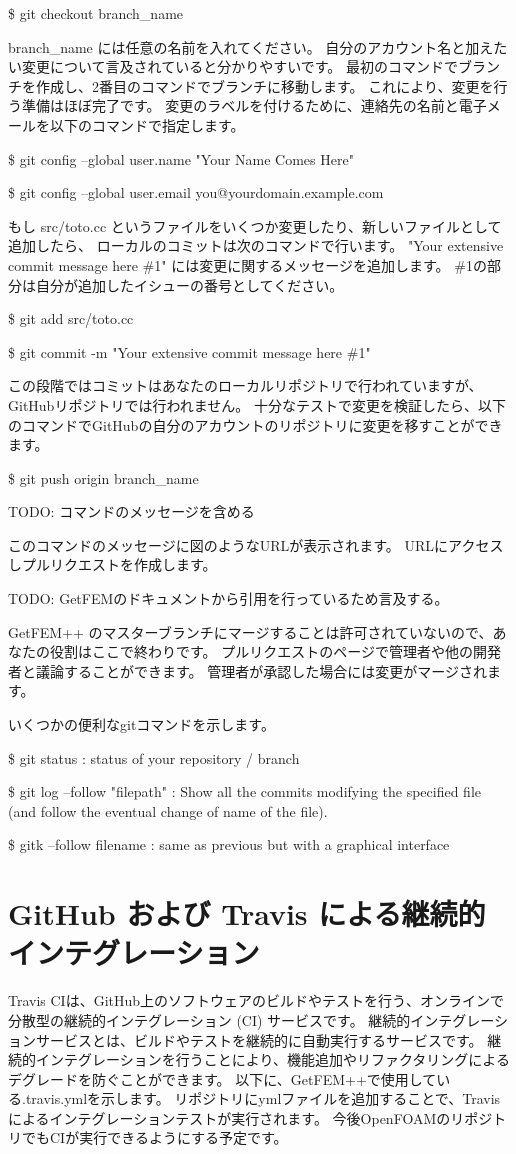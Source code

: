 \documentclass{ltjoc}
\begin{document}
\$ git checkout branch\_name

branch\_name には任意の名前を入れてください。
自分のアカウント名と加えたい変更について言及されていると分かりやすいです。
最初のコマンドでブランチを作成し、2番目のコマンドでブランチに移動します。
これにより、変更を行う準備はほぼ完了です。
変更のラベルを付けるために、連絡先の名前と電子メールを以下のコマンドで指定します。

\$ git config --global user.name "Your Name Comes Here"

\$ git config --global user.email you@yourdomain.example.com

もし src/toto.cc というファイルをいくつか変更したり、新しいファイルとして追加したら、
ローカルのコミットは次のコマンドで行います。
"Your extensive commit message here \#1" には変更に関するメッセージを追加します。
\#1の部分は自分が追加したイシューの番号としてください。

\$ git add src/toto.cc

\$ git commit -m "Your extensive commit message here \#1"

この段階ではコミットはあなたのローカルリポジトリで行われていますが、GitHubリポジトリでは行われません。
十分なテストで変更を検証したら、以下のコマンドでGitHubの自分のアカウントのリポジトリに変更を移すことができます。

\$ git push origin branch\_name

TODO: コマンドのメッセージを含める

このコマンドのメッセージに図のようなURLが表示されます。
URLにアクセスしプルリクエストを作成します。

TODO: GetFEMのドキュメントから引用を行っているため言及する。

GetFEM++ のマスターブランチにマージすることは許可されていないので、あなたの役割はここで終わりです。
プルリクエストのページで管理者や他の開発者と議論することができます。
管理者が承認した場合には変更がマージされます。

いくつかの便利なgitコマンドを示します。

\$ git status  : status of your repository / branch

\$ git log --follow "filepath"   : Show all the commits modifying the specified file (and follow the eventual change of name of the file).

\$ gitk --follow filename : same as previous but with a graphical interface

\section{GitHub および Travis による継続的インテグレーション}
Travis CIは、GitHub上のソフトウェアのビルドやテストを行う、オンラインで分散型の継続的インテグレーション (CI) サービスです。
継続的インテグレーションサービスとは、ビルドやテストを継続的に自動実行するサービスです。
継続的インテグレーションを行うことにより、機能追加やリファクタリングによるデグレードを防ぐことができます。
以下に、GetFEM++で使用している.travis.ymlを示します。
リポジトリにymlファイルを追加することで、Travisによるインテグレーションテストが実行されます。
今後OpenFOAMのリポジトリでもCIが実行できるようにする予定です。
\end{document}
